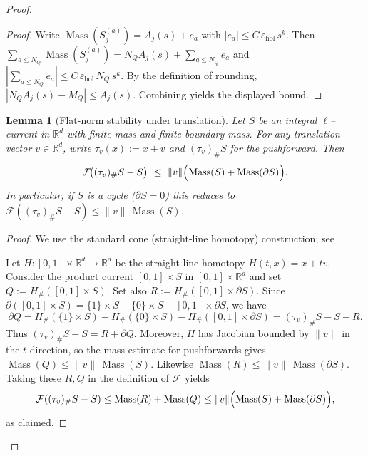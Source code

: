 \documentclass[11pt]{article}
\numberwithin{equation}{section}  %
\theoremstyle{plain}
\newtheorem{lemma}[theorem]{Lemma}
\theoremstyle{definition}
\theoremstyle{remark}
\newcommand{\R}{\mathbb{R}}
\DeclareMathOperator{\Mass}{Mass}
\begin{document}
\begin{proof}
\begin{proof}
Write $\Mass(S^{(a)}_j)=A_j(s)+e_a$ with $|e_a|\le C\,\varepsilon_{\mathrm{hol}}\,s^{k}$.
Then $\sum_{a\le N_Q}\Mass(S^{(a)}_j)=N_QA_j(s)+\sum_{a\le N_Q}e_a$ and
$|\sum_{a\le N_Q}e_a|\le C\,\varepsilon_{\mathrm{hol}}\,N_Q\,s^{k}$.
By the definition of rounding, $|N_QA_j(s)-M_Q|\le A_j(s)$.
Combining yields the displayed bound.
\end{proof}






\begin{lemma}[Flat-norm stability under translation]\label{lem:flat-translate}
Let $S$ be an integral $\ell$--current in $\R^d$ with finite mass and finite boundary mass.
For any translation vector $v\in\R^d$, write $\tau_v(x):=x+v$ and $(\tau_v)_\#S$ for the pushforward.
Then
\[
\mathcal F\!\bigl((\tau_v)_\#S-S\bigr)\ \le\ \|v\|\Bigl(\Mass(S)+\Mass(\partial S)\Bigr).
\]
In particular, if $S$ is a cycle ($\partial S=0$) this reduces to
$\mathcal F((\tau_v)_\#S-S)\le \|v\|\,\Mass(S)$.
\end{lemma}

\begin{proof}
We use the standard cone (straight-line homotopy) construction; see \cite{Fed69}.

Let $H:[0,1]\times\R^d\to\R^d$ be the straight-line homotopy $H(t,x)=x+t v$.
Consider the product current $[0,1]\times S$ in $[0,1]\times\R^d$ and set
\(
Q:=H_\#([0,1]\times S).
\)
Set also
\(
R:=H_\#([0,1]\times \partial S).
\)
Since $\partial([0,1]\times S)=\{1\}\times S-\{0\}\times S-[0,1]\times \partial S$, we have
\[
\partial Q
=H_\#(\{1\}\times S)-H_\#(\{0\}\times S)-H_\#([0,1]\times \partial S)
=(\tau_v)_\#S-S-R.
\]
Thus $(\tau_v)_\#S-S=R+\partial Q$.
Moreover, $H$ has Jacobian bounded by $\|v\|$ in the $t$-direction, so the mass estimate for pushforwards gives
\(
\Mass(Q)\le \|v\|\,\Mass(S).
\)
Likewise $\Mass(R)\le \|v\|\,\Mass(\partial S)$.
Taking these $R,Q$ in the definition of $\mathcal F$ yields
\[
\mathcal F((\tau_v)_\#S-S)\le \Mass(R)+\Mass(Q)\le \|v\|\Bigl(\Mass(S)+\Mass(\partial S)\Bigr),
\]
as claimed.
\end{proof}


\end{proof}
\end{document}

